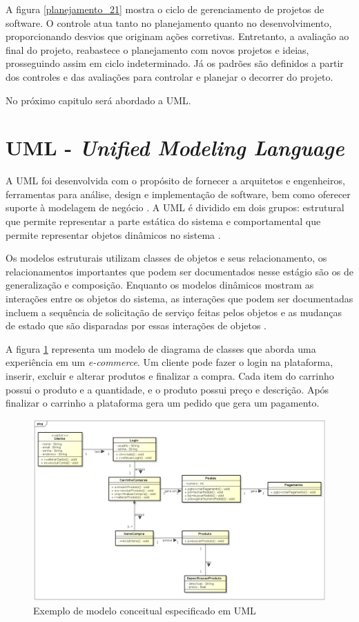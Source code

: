A figura \ref{planejamento_21} mostra o ciclo de gerenciamento de projetos de software. O controle atua tanto no planejamento quanto no desenvolvimento, proporcionando desvios que originam ações corretivas. Entretanto, a avaliação ao final do projeto, reabastece o planejamento com novos projetos e ideias, prosseguindo assim em ciclo indeterminado. Já os padrões são definidos a partir dos controles e das avaliações para controlar e planejar o decorrer do projeto.

No próximo capitulo será abordado a UML.

\section{UML - \textit{Unified Modeling Language}}
A UML foi desenvolvida com o propósito de fornecer a arquitetos e engenheiros, ferramentas para análise, design e implementação de software, bem como oferecer suporte à modelagem de negócio \cite{gasparini2018driv}. A UML é dividido em dois grupos: estrutural que permite representar a parte estática do sistema e comportamental que permite representar objetos dinâmicos no sistema \cite{silva2018sasml}.

Os modelos estruturais utilizam classes de objetos e seus relacionamento, os relacionamentos importantes que podem ser documentados nesse estágio são os de generalização e composição. Enquanto os modelos dinâmicos mostram as interações entre os objetos do sistema, as interações que podem ser documentadas incluem a sequência de solicitação de serviço feitas pelos objetos e as mudanças de estado que são disparadas por essas interações de objetos \cite{sommerville2011software}.

A figura \ref{Exemplo_UML} representa um modelo de diagrama de classes que aborda uma experiência em um \textit{e-commerce}. Um cliente pode fazer o login na plataforma, inserir, excluir e alterar produtos e finalizar a compra. Cada item do carrinho possui o produto e a quantidade, e o produto possui preço e descrição.
Após finalizar o carrinho a plataforma gera um pedido que gera um pagamento.
\begin{figure}[htb]
	\caption{\label{Exemplo_UML} Exemplo de modelo conceitual especificado em UML}
	\begin{center}
		\includegraphics[scale=0.45]{./Figuras/Exemplo_UML.png}
	\end{center}
\end{figure}

